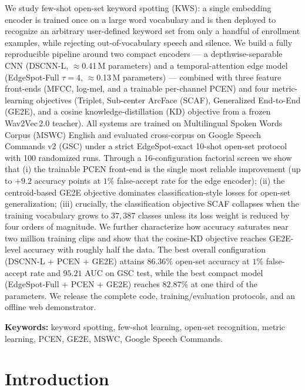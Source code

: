 \documentclass[12pt,a4paper]{report}
\begin{document}
We study few-shot open-set keyword spotting (KWS): a single embedding encoder is
trained once on a large word vocabulary and is then deployed to recognize an
arbitrary user-defined keyword set from only a handful of enrollment examples,
while rejecting out-of-vocabulary speech and silence. We build a fully
reproducible pipeline around two compact encoders --- a depthwise-separable CNN
(DSCNN-L, $\approx$0.41\,M parameters) and a temporal-attention edge model
(EdgeSpot-Full $\tau{=}4$, $\approx$0.13\,M parameters) --- combined with three
feature front-ends (MFCC, log-mel, and a trainable per-channel PCEN) and four
metric-learning objectives (Triplet, Sub-center ArcFace (SCAF), Generalized
End-to-End (GE2E), and a cosine knowledge-distillation (KD) objective from a
frozen Wav2Vec\,2.0 teacher). All systems are trained on Multilingual Spoken
Words Corpus (MSWC) English and evaluated cross-corpus on Google Speech Commands
v2 (GSC) under a strict EdgeSpot-exact 10-shot open-set protocol with 100
randomized runs. Through a 16-configuration factorial screen we show that
(i) the trainable PCEN front-end is the single most reliable improvement (up to
$+9.2$ accuracy points at $1\%$ false-accept rate for the edge encoder);
(ii) the centroid-based GE2E objective dominates classification-style losses for
open-set generalization;
(iii) crucially, the classification objective SCAF collapses when the training
vocabulary grows to $37{,}387$ classes unless its loss weight is reduced by four
orders of magnitude.
We further characterize how accuracy saturates near two million training clips
and show that the cosine-KD objective reaches GE2E-level accuracy with roughly
half the data. The best overall configuration (DSCNN-L + PCEN + GE2E) attains
$86.36\%$ open-set accuracy at $1\%$ false-accept rate and $95.21$ AUC on GSC
test, while the best compact model (EdgeSpot-Full + PCEN + GE2E) reaches
$82.87\%$ at one third of the parameters. We release the complete code,
training/evaluation protocols, and an offline web demonstrator.

\bigskip
\noindent\textbf{Keywords:} keyword spotting, few-shot learning, open-set
recognition, metric learning, PCEN, GE2E, MSWC, Google Speech Commands.

\tableofcontents

\clearpage
{}
\chapter{Introduction}\label{ch:intro}
\end{document}

